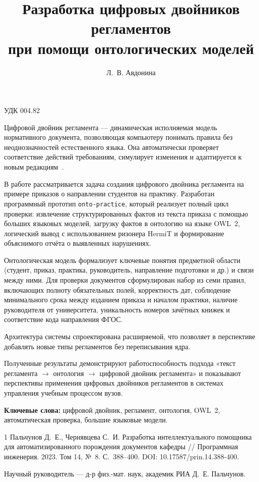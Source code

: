 \documentclass{amsart}
\title{Разработка цифровых двойников регламентов\\
при помощи онтологических моделей}
\author{Л.~В. Авдонина}
\begin{document}
\noindent УДК 004.82

\maketitle

Цифровой двойник регламента --- динамическая исполняемая модель нормативного документа,
позволяющая компьютеру понимать правила без неоднозначностей естественного языка.
Она автоматически проверяет соответствие действий требованиям, симулирует изменения
и адаптируется к новым редакциям~\cite{palchunov}.

В работе рассматривается задача создания цифрового двойника регламента на примере
приказов о направлении студентов на практику. Разработан программный прототип
\texttt{onto-practice}, который реализует полный цикл проверки: извлечение
структурированных фактов из текста приказа с помощью больших языковых моделей,
загрузку фактов в онтологию на языке OWL~2, логический вывод с использованием
ризонера HermiT и формирование объяснимого отчёта о выявленных нарушениях.

Онтологическая модель формализует ключевые понятия предметной области (студент,
приказ, практика, руководитель, направление подготовки и др.) и связи между ними.
Для проверки документов сформулирован набор из семи правил, включающих полноту
обязательных полей, корректность дат, соблюдение минимального срока между изданием
приказа и началом практики, наличие руководителя от университета, уникальность
номеров зачётных книжек и соответствие кода направления ФГОС.

Архитектура системы спроектирована расширяемой, что позволяет в перспективе
добавлять новые типы регламентов без переписывания ядра.

Полученные результаты демонстрируют работоспособность подхода
«текст регламента $\to$ онтология $\to$ цифровой двойник регламента» и показывают
перспективы применения цифровых двойников регламентов в системах управления
учебным процессом вузов.

{\bf Ключевые слова:}
цифровой двойник, регламент, онтология, OWL~2, автоматическая проверка,
большие языковые модели.

\begin{thebibliography}{1}
Пальчунов Д.~Е., Чернявцева С.~И.
Разработка интеллектуального помощника для автоматизированного порождения
документов кафедры // Программная инженерия. 2023. Том 14, №~8. С.~388--400.
DOI: 10.17587/prin.14.388-400.
\end{thebibliography}

\medskip
\noindent Научный руководитель --- д-р физ.-мат. наук, академик РИА
Д.~Е. Пальчунов.
\end{document}
